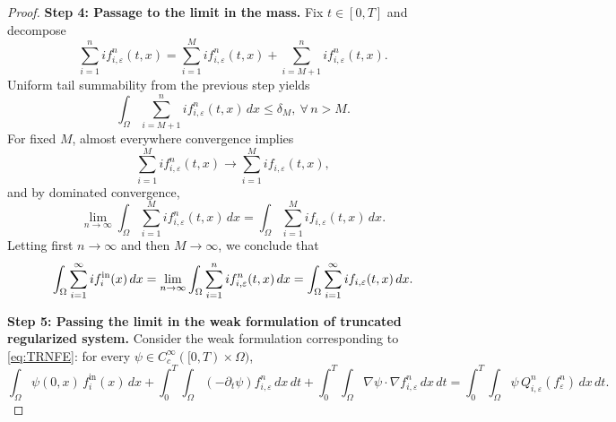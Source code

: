 \documentclass[a4paper,12pt,reqno]{amsart}
\theoremstyle{plain}
\numberwithin{equation}{section}
\begin{document}
\begin{proof}
		
		\medskip
		\textbf{Step 4: Passage to the limit in the mass.}
		Fix $t\in[0,T]$ and decompose
		\[
		\sum_{i=1}^{n} i f_{i,\varepsilon}^n(t,x)
		=
		\sum_{i=1}^{M} i f_{i,\varepsilon}^n(t,x)
		+
		\sum_{i=M+1}^{n} i f_{i,\varepsilon}^n(t,x).
		\]
		Uniform tail summability from the previous step yields
		\[
		\int_\Omega \sum_{i=M+1}^{n} i f_{i,\varepsilon}^n(t,x)\,dx
		\le \delta_M, \ \forall \, n>M.
		\]
		For fixed $M$, almost everywhere convergence implies
		\[
		\sum_{i=1}^{M} i f_{i,\varepsilon}^n(t,x)
		\to
		\sum_{i=1}^{M} i f_{i,\varepsilon}(t,x),
		\]
		and by dominated convergence,
		\[
		\lim_{n\to\infty}
		\int_\Omega \sum_{i=1}^{M} i f_{i,\varepsilon}^n(t,x)\,dx
		=
		\int_\Omega \sum_{i=1}^{M} i f_{i,\varepsilon}(t,x)\,dx.
		\]
		Letting first $n\to\infty$ and then $M\to\infty$, we conclude that
		\[
		\int_\Omega \sum_{i=1}^{\infty} i f_{i}^{\rm{in}}(x)\,dx= \lim_{n\to\infty}
		\int_\Omega \sum_{i=1}^{n} i f_{i,\varepsilon}^n(t,x)\,dx
		=
		\int_\Omega \sum_{i=1}^{\infty} i f_{i,\varepsilon}(t,x)\,dx.
		\]
		
		\textbf{Step 5: Passing the limit in the weak formulation of truncated regularized system.} Consider the weak formulation corresponding to \eqref{eq:TRNFE}: for every $\psi\in C_c^{\infty}([0,T)\times\Omega)$,
		\[
		\int_\Omega
		\psi(0,x)\, f_i^{\mathrm{in}}(x)\, dx
		+
		\int_0^T \int_\Omega
		\left(-\partial_t \psi\right) f_{i,\varepsilon}^n
		\,dx\,dt
		+
		\int_0^T \int_\Omega
		\nabla \psi \cdot \nabla f_{i,\varepsilon}^n
		\,dx\,dt=
		\int_0^T \int_\Omega
		\psi \, Q_{i,\varepsilon}^n(f_{\varepsilon}^n)
		\,dx\,dt.
		\]
		

\end{proof}
\end{document}
